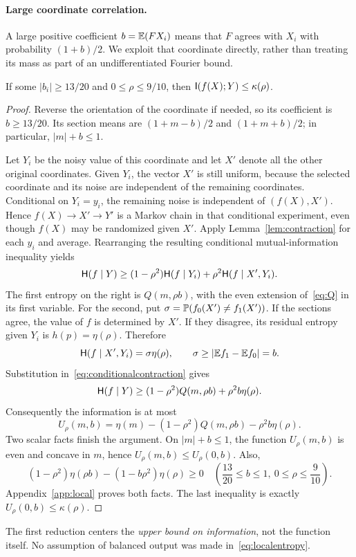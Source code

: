 \paragraph{Large coordinate correlation.}
A large positive coefficient $b=\mathbb E(FX_i)$ means that $F$ agrees with $X_i$ with probability $(1+b)/2$. We exploit that coordinate directly, rather than treating its mass as part of an undifferentiated Fourier bound.

\begin{lemma}\label{lem:largecoordinate}
If some $|b_i|\ge13/20$ and $0\le\rho\le9/10$, then $\mathsf I(f(X);Y)\le\kappa(\rho)$.
\end{lemma}
\begin{proof}
Reverse the orientation of the coordinate if needed, so its coefficient is $b\ge13/20$. Its section means are $(1+m-b)/2$ and $(1+m+b)/2$; in particular, $|m|+b\le1$.

Let $Y_i$ be the noisy value of this coordinate and let $X'$ denote all the other original coordinates. Given $Y_i$, the vector $X'$ is still uniform, because the selected coordinate and its noise are independent of the remaining coordinates. Conditional on $Y_i=y_i$, the remaining noise is independent of $(f(X),X')$. Hence $f(X)\to X'\to Y'$ is a Markov chain in that conditional experiment, even though $f(X)$ may be randomized given $X'$. Apply Lemma~\ref{lem:contraction} for each $y_i$ and average. Rearranging the resulting conditional mutual-information inequality yields
\begin{equation}\label{eq:conditionalcontraction}
\mathsf H(f\mid Y)\ge(1-\rho^2)\mathsf H(f\mid Y_i)+\rho^2\mathsf H(f\mid X',Y_i).
\end{equation}
The first entropy on the right is $Q(m,\rho b)$, with the even extension of~\eqref{eq:Q} in its first variable. For the second, put $\sigma=\mathbb P(f_0(X')\ne f_1(X'))$. If the sections agree, the value of $f$ is determined by $X'$. If they disagree, its residual entropy given $Y_i$ is $h(p)=\eta(\rho)$. Therefore
\[
\mathsf H(f\mid X',Y_i)=\sigma\eta(\rho),\qquad
\sigma\ge|\mathbb E f_1-\mathbb E f_0|=b.
\]
Substitution in~\eqref{eq:conditionalcontraction} gives
\begin{equation}\label{eq:localentropy}
\mathsf H(f\mid Y)\ge(1-\rho^2)Q(m,\rho b)+\rho^2b\eta(\rho).
\end{equation}
Consequently the information is at most
\begin{equation}\label{eq:U}
U_\rho(m,b)=\eta(m)-(1-\rho^2)Q(m,\rho b)-\rho^2b\eta(\rho).
\end{equation}
Two scalar facts finish the argument. On $|m|+b\le1$, the function $U_\rho(m,b)$ is even and concave in $m$, hence $U_\rho(m,b)\le U_\rho(0,b)$. Also,
\begin{equation}\label{eq:largecoordscalar}
(1-\rho^2)\eta(\rho b)-(1-b\rho^2)\eta(\rho)\ge0
\quad\left(\frac{13}{20}\le b\le1,\ 0\le\rho\le\frac9{10}\right).
\end{equation}
Appendix~\ref{app:local} proves both facts. The last inequality is exactly $U_\rho(0,b)\le\kappa(\rho)$.
\end{proof}
The first reduction centers the \emph{upper bound on information}, not the function itself. No assumption of balanced output was made in~\eqref{eq:localentropy}.

